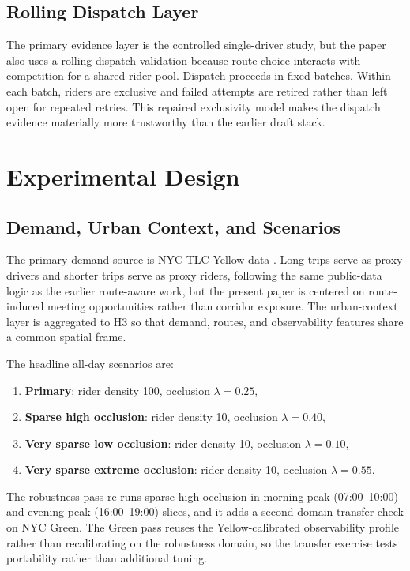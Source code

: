 \documentclass[journal]{IEEEtran}
\begin{document}
\subsection{Rolling Dispatch Layer}
The primary evidence layer is the controlled single-driver study, but the paper also uses a rolling-dispatch validation because route choice interacts with competition for a shared rider pool. Dispatch proceeds in fixed batches. Within each batch, riders are exclusive and failed attempts are retired rather than left open for repeated retries. This repaired exclusivity model makes the dispatch evidence materially more trustworthy than the earlier draft stack.

\section{Experimental Design}
\subsection{Demand, Urban Context, and Scenarios}
The primary demand source is NYC TLC Yellow data \cite{azureyellow}. Long trips serve as proxy drivers and shorter trips serve as proxy riders, following the same public-data logic as the earlier route-aware work, but the present paper is centered on route-induced meeting opportunities rather than corridor exposure. The urban-context layer is aggregated to H3 so that demand, routes, and observability features share a common spatial frame.

The headline all-day scenarios are:
\begin{enumerate}
\item \textbf{Primary}: rider density 100, occlusion $\lambda=0.25$,
\item \textbf{Sparse high occlusion}: rider density 10, occlusion $\lambda=0.40$,
\item \textbf{Very sparse low occlusion}: rider density 10, occlusion $\lambda=0.10$,
\item \textbf{Very sparse extreme occlusion}: rider density 10, occlusion $\lambda=0.55$.
\end{enumerate}

The robustness pass re-runs sparse high occlusion in morning peak (07:00--10:00) and evening peak (16:00--19:00) slices, and it adds a second-domain transfer check on NYC Green. The Green pass reuses the Yellow-calibrated observability profile rather than recalibrating on the robustness domain, so the transfer exercise tests portability rather than additional tuning.
\end{document}

